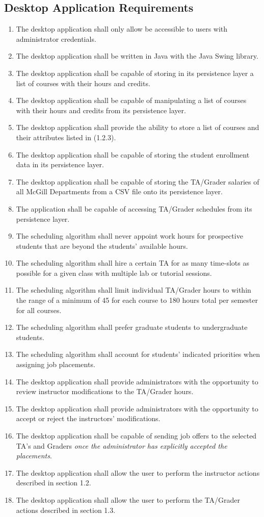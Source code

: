 \documentclass[12pt]{report}
\begin{document}
\subsection{Desktop Application Requirements}
\begin{enumerate}[\thesubsection .1]
	\item The desktop application shall only allow be accessible to users with administrator credentials.
	\item The desktop application shall be written in Java with the Java Swing library.
	\item The desktop application shall be capable of storing in its persistence layer a list of courses with their hours and credits.
	\item The desktop application shall be capable of manipulating a list of courses with their hours and credits from its persistence layer.
	\item The desktop application shall provide the ability to store a list of courses and their attributes listed in (1.2.3).
	\item The desktop application shall be capable of storing the student enrollment data in its persistence layer.
    \item  The desktop application shall be capable of storing the TA/Grader salaries of all McGill Departments from a CSV file onto its persistence layer.
	\item The application shall be capable of accessing TA/Grader schedules from its persistence layer.
	\item The scheduling algorithm shall never appoint work hours for prospective students that are beyond the students' available hours.
	\item The scheduling algorithm shall hire a certain TA for as many time-slots as possible for a given class with multiple lab or tutorial sessions.
	\item The scheduling algorithm shall limit individual TA/Grader hours to within the range of  a minimum of 45 for each course to 180 hours total per semester for all courses.
	\item The scheduling algorithm shall prefer graduate students to undergraduate students.
	\item The scheduling algorithm shall account for students' indicated priorities when assigning job placements.
	\item The desktop application shall provide administrators with the opportunity to review instructor modifications to the TA/Grader hours.
	\item The desktop application shall provide administrators with the opportunity to accept or reject the instructors' modifications.
	\item The desktop application shall be capable of sending job offers to the selected TA's and Graders \textit{once the administrator has explicitly accepted the placements}.
	\item The desktop application shall allow the user to perform the instructor actions described in section 1.2.
	\item The desktop application shall allow the user to perform the TA/Grader actions described in section 1.3.
\end{enumerate}
\end{document}
